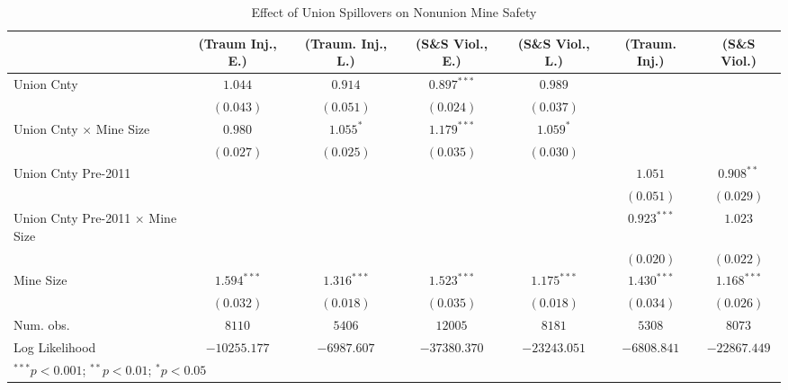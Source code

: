 
\begin{table}[H]
\begin{center}
\begin{tabular}{l c c c c c c}
\hline
 & (Traum Inj., E.) & (Traum. Inj., L.) & (S\&S Viol., E.) & (S\&S Viol., L.) & (Traum. Inj.) & (S\&S Viol.) \\
\hline
Union Cnty                               & $1.044$       & $0.914$       & $0.897^{***}$ & $0.989$       &               &               \\
                                         & $(0.043)$     & $(0.051)$     & $(0.024)$     & $(0.037)$     &               &               \\
Union Cnty $ \times $ Mine Size          & $0.980$       & $1.055^{*}$   & $1.179^{***}$ & $1.059^{*}$   &               &               \\
                                         & $(0.027)$     & $(0.025)$     & $(0.035)$     & $(0.030)$     &               &               \\
Union Cnty Pre-2011                      &               &               &               &               & $1.051$       & $0.908^{**}$  \\
                                         &               &               &               &               & $(0.051)$     & $(0.029)$     \\
Union Cnty Pre-2011 $ \times $ Mine Size &               &               &               &               & $0.923^{***}$ & $1.023$       \\
                                         &               &               &               &               & $(0.020)$     & $(0.022)$     \\
Mine Size                                & $1.594^{***}$ & $1.316^{***}$ & $1.523^{***}$ & $1.175^{***}$ & $1.430^{***}$ & $1.168^{***}$ \\
                                         & $(0.032)$     & $(0.018)$     & $(0.035)$     & $(0.018)$     & $(0.034)$     & $(0.026)$     \\
\hline
Num. obs.                                & $8110$        & $5406$        & $12005$       & $8181$        & $5308$        & $8073$        \\
Log Likelihood                           & $-10255.177$  & $-6987.607$   & $-37380.370$  & $-23243.051$  & $-6808.841$   & $-22867.449$  \\
\hline
\multicolumn{7}{l}{\scriptsize{$^{***}p<0.001$; $^{**}p<0.01$; $^{*}p<0.05$}}
\end{tabular}
\caption{Effect of Union Spillovers on Nonunion Mine Safety}
\label{irr_100employees_union_extern}
\end{center}
\end{table}

